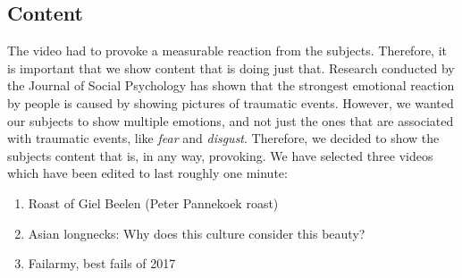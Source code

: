 \documentclass[sigconf]{acmart}
\begin{document}
\subsection{Content}
The video had to provoke a measurable reaction from the subjects. Therefore, it is important that we show content
that is doing just that. Research conducted by the Journal of Social Psychology \cite{leary2015seemingly}
has shown that the strongest emotional reaction by people is caused by showing pictures of traumatic events.
However, we wanted our subjects to show multiple emotions, and not just the ones that are associated with
traumatic events, like \emph{fear} and \emph{disgust}. Therefore, we decided to show the subjects content
that is, in any way, provoking. We have selected three videos which have been edited to last roughly one minute:
\begin{enumerate}
    \item{Roast of Giel Beelen (Peter Pannekoek roast)}
    \item{Asian longnecks: Why does this culture consider this beauty?}
    \item{Failarmy, best fails of 2017}
\end{enumerate}

\end{document}
